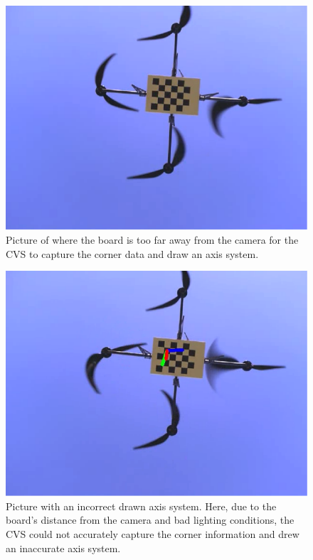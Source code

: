 \begin{figure}
  \centering
  \includegraphics[width=\textwidth]{figures/appendices/oov4}
  \caption{Picture of where the board is too far away from the camera for the CVS to capture the corner data and draw an axis system.}
\end{figure}

\begin{figure}
  \centering
  \includegraphics[width=\textwidth]{figures/appendices/oov7}
  \caption[Picture with an incorrect drawn axis system.]{Picture with an incorrect drawn axis system. Here, due to the board's distance from the camera and bad lighting conditions, the CVS could not accurately capture the corner information and drew an inaccurate axis system.}
\end{figure}

\endinput
